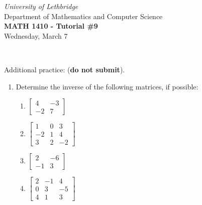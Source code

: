\documentclass[12pt]{article}
\newcommand{\skipline}{\vspace{12pt}}
\newcommand{\bbm}{\begin{bmatrix}}
\newcommand{\ebm}{\end{bmatrix}}
\begin{document}
\author{Instructor: Sean Fitzpatrick}
\thispagestyle{empty}
\begin{center}
\emph{University of Lethbridge}\\
Department of Mathematics and Computer Science\\
{\bf MATH 1410 - Tutorial \#9}\\
Wednesday, March 7
\end{center}
\skipline \ \noindent \skipline

\vspace*{\fill}







Additional practice: (\textbf{do not submit}).
\begin{enumerate}
\item Determine the inverse of the following matrices, if possible: 
\begin{multicols}{2}
\begin{enumerate}
\item $\bbm 4&-3\\-2&7\ebm$
\item $\bbm 1&0&3\\-2&1&4\\3&2&-2\ebm$
\item $\bbm 2&-6\\-1&3\ebm$
\item $\bbm 2&-1&4\\0&3&-5\\4&1&3\ebm$
\end{enumerate}
\end{multicols}
\end{enumerate}

\newpage
\end{document}
